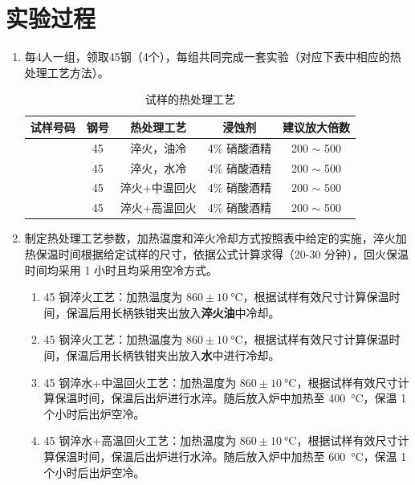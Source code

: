 \documentclass[a4paper,utf8]{article}
\begin{document}
\section{实验过程}%
    \begin{enumerate}
        \item 每4人一组，领取45钢（4个），每组共同完成一套实验（对应下表中相应的热处理工艺方法）。
        \begin{table}[!ht]\centering
            \caption{试样的热处理工艺}
             \newcommand{\Sam}{\stepcounter{sample}\thesample}
            \begin{tabular}{|*{5}{c|}}\hline
                试样号码 & 钢号 & 热处理工艺 & 浸蚀剂 & 建议放大倍数 \\ \hline
                \Sam & 45 & 淬火，油冷 & 4\% 硝酸酒精 & 200 $\sim$ 500 \\ \hline
                \Sam & 45 & 淬火，水冷 & 4\% 硝酸酒精 & 200 $\sim$ 500 \\ \hline
                \Sam & 45 & 淬火+中温回火 & 4\% 硝酸酒精 & 200 $\sim$ 500 \\ \hline
                \Sam & 45 & 淬火+高温回火 & 4\% 硝酸酒精 & 200 $\sim$ 500 \\ \hline
            \end{tabular}
        \end{table}
        \item 制定热处理工艺参数，加热温度和淬火冷却方式按照表中给定的实施，淬火加热保温时间根据给定试样的尺寸，依据公式计算求得（20-30 分钟），回火保温时间均采用 1 小时且均采用空冷方式。
        \begin{enumerate}
            \item 45 钢淬火工艺：加热温度为 $860 \pm \SI{10}{\degreeCelsius}$，根据试样有效尺寸计算保温时间，保温后用长柄铁钳夹出放入\textbf{淬火油}中冷却。
            \item 45 钢淬火工艺：加热温度为 $860 \pm \SI{10}{\degreeCelsius}$，根据试样有效尺寸计算保温时间，保温后用长柄铁钳夹出放入\textbf{水}中进行冷却。
            \item 45 钢淬水+中温回火工艺：加热温度为 $860 \pm \SI{10}{\degreeCelsius}$，根据试样有效尺寸计算保温时间，保温后出炉进行水淬。随后放入炉中加热至 \SI{400}{\degreeCelsius}，保温 1 个小时后出炉空冷。
            \item 45 钢淬水+高温回火工艺：加热温度为 $860 \pm \SI{10}{\degreeCelsius}$，根据试样有效尺寸计算保温时间，保温后出炉进行水淬。随后放入炉中加热至 \SI{600}{\degreeCelsius}，保温 1 个小时后出炉空冷。

\end{enumerate}
\end{enumerate}
\end{document}
